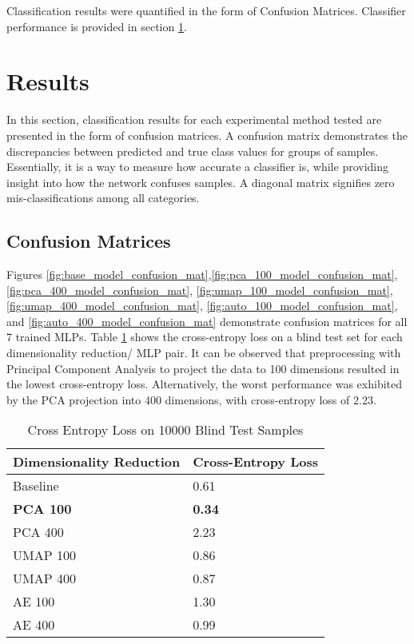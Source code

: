 \documentclass[conference]{IEEEtran}
\begin{document}
Classification results were quantified in the form of Confusion Matrices.  Classifier performance is provided in section \ref{Results}.



\section{Results} \label{Results}

In this section, classification results for each experimental method tested are presented in the form of confusion matrices.  A confusion matrix demonstrates the discrepancies between predicted and true class values for groups of samples.  Essentially, it is a way to measure how accurate a classifier is, while providing insight into how the network confuses samples.  A diagonal matrix signifies zero mis-classifications among all categories.

\subsection{Confusion Matrices}
Figures \ref{fig:base_model_confusion_mat},\ref{fig:pca_100_model_confusion_mat},\ref{fig:pca_400_model_confusion_mat}, \ref{fig:umap_100_model_confusion_mat}, \ref{fig:umap_400_model_confusion_mat}, \ref{fig:auto_100_model_confusion_mat}, and \ref{fig:auto_400_model_confusion_mat} demonstrate confusion matrices for all 7 trained MLPs.  Table \ref{tab:cross_entropy_loss_table} shows the cross-entropy loss on a blind test set for each dimensionality reduction/ MLP pair.  It can be observed that preprocessing with Principal Component Analysis to project the data to 100 dimensions resulted in the lowest cross-entropy loss.  Alternatively, the worst performance was exhibited by the PCA projection into 400 dimensions, with cross-entropy loss of 2.23.

\begin{table}[h!]
	\caption{Cross Entropy Loss on 10000 Blind Test Samples}
	\label{tab:cross_entropy_loss_table}
	\normalsize
	\begin{center}
		\begin{tabularx}{0.5\textwidth}{ |X|X| } 
			\hline
			\textbf{Dimensionality Reduction}  & \textbf{Cross-Entropy Loss} \\
			\hline
			Baseline & 0.61 \\
			\hline
			\textbf{PCA 100} & \textbf{0.34} \\
			\hline
			PCA 400 & 2.23 \\
			\hline
			UMAP 100 & 0.86 \\
			\hline
			UMAP 400 & 0.87 \\
			\hline
			AE 100 & 1.30 \\
			\hline
			AE 400 & 0.99 \\
			\hline
		\end{tabularx}
	\end{center}
\end{table} 
\end{document}
